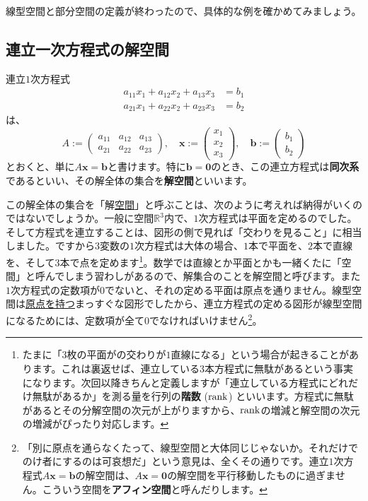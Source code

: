 線型空間と部分空間の定義が終わったので、具体的な例を確かめてみましょう。

\subsection{連立一次方程式の解空間}

連立$1$次方程式
\begin{align*}
a_{11} x_1 + a_{12} x_2 + a_{13} x_3 &= b_1 \\
a_{21} x_1 + a_{22} x_2 + a_{23} x_3 &= b_2
\end{align*}
は、
\[
A :=
\begin{pmatrix}
a_{11} & a_{12} & a_{13} \\
a_{21} & a_{22} & a_{23}
\end{pmatrix}, \quad
\bm{x} :=
\begin{pmatrix}
x_1 \\
x_2 \\
x_3
\end{pmatrix}, \quad
\bm{b} := 
\begin{pmatrix}
b_1 \\
b_2
\end{pmatrix}
\]
とおくと、単に$A\bm{x} = \bm{b}$と書けます。特に$\bm{b} = \bm{0}$のとき、この連立方程式は\textbf{同次系}であるといい、その解全体の集合を\textbf{解空間}といいます。

この解全体の集合を「解\uline{空間}」と呼ぶことは、次のように考えれば納得がいくのではないでしょうか。一般に空間$\mathbb{R}^3$内で、$1$次方程式は平面を定めるのでした。そして方程式を連立することは、図形の側で見れば「交わりを見ること」に相当しました。ですから$3$変数の$1$次方程式は大体の場合、$1$本で平面を、$2$本で直線を、そして$3$本で点を定めます\footnote{たまに「$3$枚の平面がの交わりが$1$直線になる」という場合が起きることがあります。これは裏返せば、連立している$3$本方程式に無駄があるという事実になります。次回以降きちんと定義しますが「連立している方程式にどれだけ無駄があるか」を測る量を行列の\textbf{階数} ($\operatorname{rank}$) といいます。方程式に無駄があるとその分解空間の次元が上がりますから、$\operatorname{rank}$の増減と解空間の次元の増減がぴったり対応します。}。数学では直線とか平面とかも一緒くたに「空間」と呼んでしまう習わしがあるので、解集合のことを解空間と呼びます。また$1$次方程式の定数項が$0$でないと、それの定める平面は原点を通りません。線型空間は\uline{原点を持つ}まっすぐな図形でしたから、連立方程式の定める図形が線型空間になるためには、定数項が全て$0$でなければいけません\footnote{「別に原点を通らなくたって、線型空間と大体同じじゃないか。それだけでのけ者にするのは可哀想だ」という意見は、全くその通りです。連立$1$次方程式$A\bm{x} = \bm{b}$の解空間は、$A\bm{x} = \bm{0}$の解空間を平行移動したものに過ぎません。こういう空間を\textbf{アフィン空間}と呼んだりします。}。

